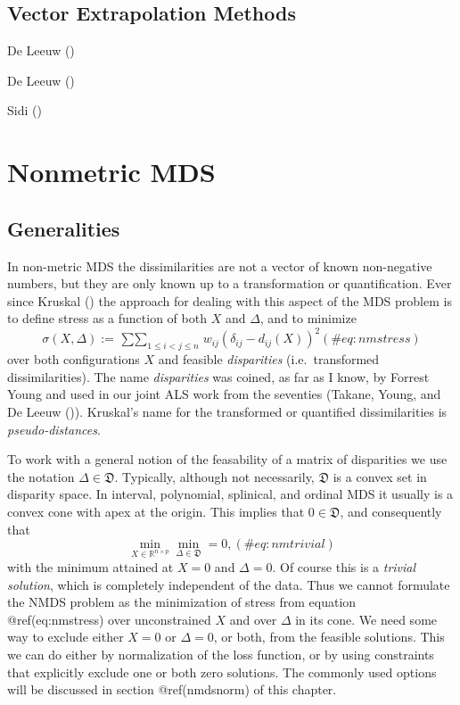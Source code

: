 \documentclass[
  12pt,
  letterpaper,
  DIV=11,
  numbers=noendperiod]{scrreprt}
\theoremstyle{remark}
\begin{document}
\section{Vector Extrapolation
Methods}\label{vector-extrapolation-methods}

De Leeuw ()

De Leeuw ()

Sidi ()


\chapter{Nonmetric MDS}\label{nonmtrmds}

\section{Generalities}\label{generalities}

In non-metric MDS the dissimilarities are not a vector of known
non-negative numbers, but they are only known up to a transformation or
quantification. Ever since Kruskal ()
the approach for dealing with this aspect of the MDS problem is to
define stress as a function of both \(X\) and \(\Delta\), and to
minimize \begin{equation}
\sigma(X,\Delta):=\mathop{\sum\sum}_{1\leq i<j\leq n}w_{ij}(\delta_{ij}-d_{ij}(X))^2
(\#eq:nmstress)
\end{equation} over both configurations \(X\) and feasible
\emph{disparities} (i.e.~transformed dissimilarities). The name
\emph{disparities} was coined, as far as I know, by Forrest Young and
used in our joint ALS work from the seventies (Takane, Young, and De
Leeuw ()). Kruskal's name
for the transformed or quantified dissimilarities is
\emph{pseudo-distances}.

To work with a general notion of the feasability of a matrix of
disparities we use the notation \(\Delta\in\mathfrak{D}\). Typically,
although not necessarily, \(\mathfrak{D}\) is a convex set in disparity
space. In interval, polynomial, splinical, and ordinal MDS it usually is
a convex cone with apex at the origin. This implies that
\(0\in\mathfrak{D}\), and consequently that \begin{equation}
\min_{X\in\mathbb{R}^{n\times p}}\min_{\Delta\in\mathfrak{D}}=0,
(\#eq:nmtrivial)
\end{equation} with the minimum attained at \(X=0\) and \(\Delta=0\). Of
course this is a \emph{trivial solution}, which is completely
independent of the data. Thus we cannot formulate the NMDS problem as
the minimization of stress from equation @ref(eq:nmstress) over
unconstrained \(X\) and over \(\Delta\) in its cone. We need some way to
exclude either \(X=0\) or \(\Delta=0\), or both, from the feasible
solutions. This we can do either by normalization of the loss function,
or by using constraints that explicitly exclude one or both zero
solutions. The commonly used options will be discussed in section
@ref(nmdsnorm) of this chapter.
\end{document}
